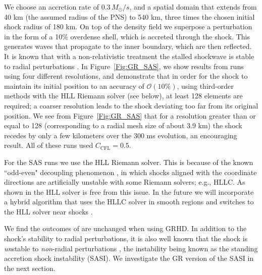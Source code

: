 \documentclass[letterpaper]{jpconf}
\newcommand{\Msun}{M_{\odot}}
\newcommand{\mc}[1]{\mathcal{#1}}
\newcommand{\figref}[1]{Figure~\ref{#1}}
\begin{document}
We choose an accretion rate of $0.3\,\Msun/s$, and a spatial domain that extends from 40 km (the assumed radius of the PNS) to 540 km, three times the chosen initial shock radius of 180 km. On top of the density field we superpose a perturbation in the form of a 10\% overdense shell, which is accreted through the shock. This generates waves that propagate to the inner boundary, which are then reflected. It is known that with a non-relativistic treatment the stalled shockwave is stable to radial perturbations \cite{Blondin2003}. In \figref{Fig:GR_SAS}, we show results from runs using four different resolutions, and demonstrate that in order for the shock to maintain its initial position to an accuracy of $\mc{O}\left(10\%\right)$, using third-order methods with the HLL Riemann solver \cite{Harten1983} (see below), at least 128 elements are required; a coarser resolution leads to the shock deviating too far from its original position. We see from \figref{Fig:GR_SAS} that for a resolution greater than or equal to 128 (corresponding to a radial mesh size of about 3.9 km) the shock recedes by only a few kilometers over the 300 ms evolution, an encouraging result. All of these runs used $C_{\text{CFL}}=0.5$.


For the SAS runs we use the HLL Riemann solver. This is because of the known ``odd-even" decoupling phenomenon \cite{Quirk1994}, in which shocks aligned with the coordinate directions are artificially unstable with some Riemann solvers; e.g., HLLC. As shown in \cite{Quirk1994} the HLL solver is free from this issue. In the future we will incorporate a hybrid algorithm that uses the HLLC solver in smooth regions and switches to the HLL solver near shocks \cite{Muller2010}.

We find the outcomes of \cite{Blondin2003} are unchanged when using GRHD. In addition to the shock's stability to radial perturbations, it is also well known that the shock is \textit{un}stable to \textit{non}-radial perturbations \cite{Blondin2003}, the instability being known as the standing accretion shock instability (SASI). We investigate the GR version of the SASI in the next section.
\end{document}
